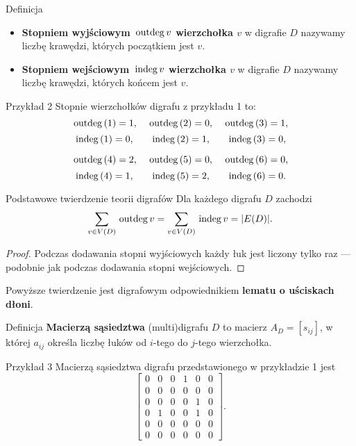 \documentclass[a4paper,10pt]{beamer}
\newcommand{\outdeg}{{\,\rm{outdeg}\,}}
\newcommand{\indeg}{{\,\rm{indeg}\,}}
\begin{document}
\begin{frame}
\begin{block}{Definicja}
		\begin{itemize}
			\item {\bf Stopniem wyjściowym $\outdeg v$ wierzchołka $v$} w digrafie $D$ nazywamy liczbę krawędzi, których początkiem jest $v$.
			\item {\bf Stopniem wejściowym $\indeg v$ wierzchołka $v$} w digrafie $D$ nazywamy liczbę krawędzi, których końcem jest $v$.
		\end{itemize}
\end{block}

\begin{exampleblock}{Przykład 2}
Stopnie wierzchołków digrafu z przykładu 1 to: %
$$\outdeg(1)=1,\ \ \ \outdeg(2)=0,\ \ \ \outdeg(3)=1,$$ $$\indeg(1)=0,\ \ \ \ \ \indeg(2)=1,\ \ \ \ \ \indeg(3)=0,$$

$$\outdeg(4)=2,\ \ \ \outdeg(5)=0,\ \ \ \outdeg(6)=0,$$ $$\indeg(4)=1,\ \ \ \ \ \indeg(5)=2,\ \ \ \ \ \indeg(6)=0.$$
\end{exampleblock}
\end{frame}


\begin{frame}

\begin{block}{Podstawowe twierdzenie teorii digrafów}
Dla każdego digrafu $D$ zachodzi $$\sum\limits_{v\in V(D)}\outdeg v=\sum\limits_{v\in V(D)}\indeg v=|E(D)|.$$
\end{block}

\begin{proof}
 Podczas dodawania stopni wyjściowych każdy łuk jest liczony tylko raz --- podobnie jak podczas dodawania stopni wejściowych.
\end{proof}

\medskip

Powyższe twierdzenie jest digrafowym odpowiednikiem {\bf lematu o uściskach dłoni}.

\end{frame}



\begin{frame}
	\begin{block}{Definicja}
		{\bf Macierzą sąsiedztwa} (multi)digrafu $D$ to macierz $A_D=[s_{ij}]$, w której $a_{ij}$ określa liczbę łuków od $i$-tego do $j$-tego wierzchołka.  
	\end{block}

\begin{exampleblock}{Przykład 3}
Macierzą sąsiedztwa digrafu przedstawionego w przykładzie 1 jest
$$\left[\begin{array}{cccccc}0&0&0&1&0&0\\0&0&0&0&0&0\\0&0&0&0&1&0\\0&1&0&0&1&0\\0&0&0&0&0&0\\0&0&0&0&0&0\end{array}\right].$$
\end{exampleblock}
\end{frame}
\end{document}
